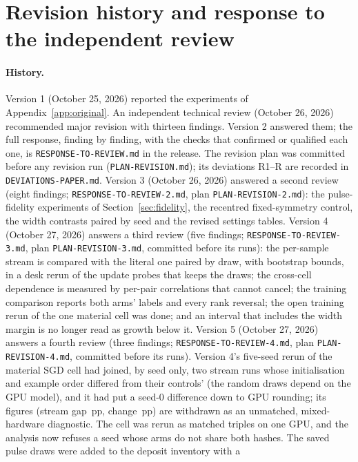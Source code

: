 \section{Revision history and response to the independent review}\label{app:revision}
\paragraph{History.} Version 1 (October 25, 2026) reported the experiments of Appendix~\ref{app:original}. An independent
technical review (October 26, 2026) recommended major revision with thirteen findings. Version 2 answered them; the
full response, finding by finding, with the checks that confirmed or qualified each one, is \texttt{RESPONSE-TO-REVIEW.md} in
the release. The revision plan was committed before any revision run (\texttt{PLAN-REVISION.md}); its deviations R1--R\RVnDev{}
are recorded in \texttt{DEVIATIONS-PAPER.md}. Version 3 (October 26, 2026) answered a second review (eight findings;
\texttt{RESPONSE-TO-REVIEW-2.md}, plan \texttt{PLAN-REVISION-2.md}): the pulse-fidelity experiments of
Section~\ref{sec:fidelity}, the recentred fixed-symmetry control, the width contrasts paired by seed and the revised
settings tables. Version 4 (October 27, 2026) answers a third review (five findings;
\texttt{RESPONSE-TO-REVIEW-3.md}, plan \texttt{PLAN-REVISION-3.md}, committed before its runs): the per-sample stream is
compared with the literal one paired by draw, with bootstrap bounds, in a desk rerun of the update probes that keeps the
draws; the cross-cell dependence is measured by per-pair correlations that cannot cancel; the training comparison reports
both arms' labels and every rank reversal; the open training rerun of the one material cell was done; and an interval that
includes the width margin is no longer read as growth below it. Version 5 (October 27, 2026) answers a
fourth review (three findings; \texttt{RESPONSE-TO-REVIEW-4.md}, plan \texttt{PLAN-REVISION-4.md}, committed before
its runs). Version 4's five-seed rerun of the material SGD cell had joined, by seed only, two stream runs whose
initialisation and example order differed from their controls' (the random draws depend on the GPU model), and it
had put a seed-0 difference down to GPU rounding; its figures (stream gap \RYAtwoRSeqGap\,pp, change \RYAtwoRD\,pp)
are withdrawn as an unmatched, mixed-hardware diagnostic. The cell was rerun as matched triples on one GPU, and the
analysis now refuses a seed whose arms do not share both hashes. The saved pulse draws were added to the deposit inventory with a
